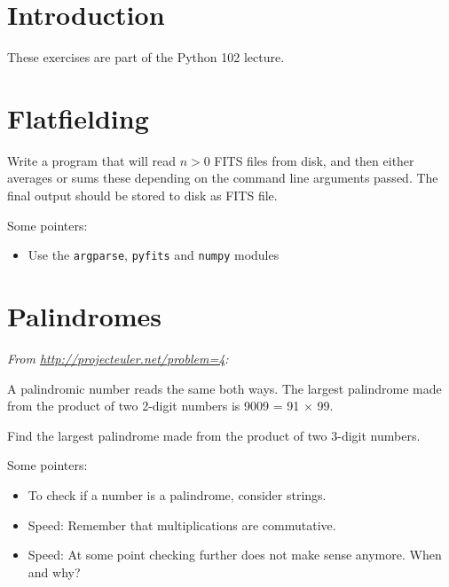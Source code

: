 \documentclass[draft=false]{article}
\newcommand{\answer}[1]{}%
\def\pythoni{\lstinline[language=pythontim]}
\begin{document}
\thispagestyle{empty}


\section*{Introduction}

These exercises are part of the Python 102 lecture.

\section{Flatfielding}

Write a program that will read $n>0$ FITS files from disk, and then either 
averages or sums these depending on the command line arguments passed. The 
final output should be stored to disk as FITS file.

Some pointers:

\begin{itemize}
	\item Use the \pythoni{argparse}, \pythoni{pyfits} and \pythoni{numpy} modules
\end{itemize}

\answer{Not available yet}

\section{Palindromes}

{\emph{From \url{http://projecteuler.net/problem=4}:}}

A palindromic number reads the same both ways. The largest palindrome made from the product of two 2-digit numbers is 9009 = 91 × 99.

Find the largest palindrome made from the product of two 3-digit numbers.

Some pointers:

\begin{itemize}
	\item To check if a number is a palindrome, consider strings.
	\item Speed: Remember that multiplications are commutative.
	\item Speed: At some point checking further does not make sense anymore. When and why?
\end{itemize}
\end{document}
